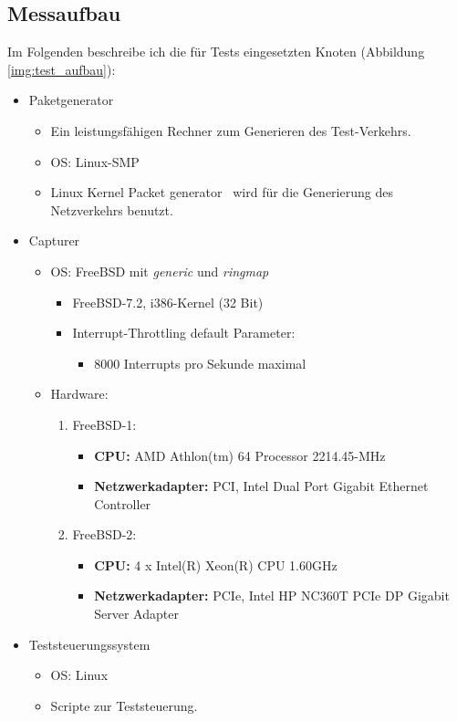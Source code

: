 \subsection{Messaufbau}\label{sec:messaufbau}
Im Folgenden beschreibe ich die für Tests eingesetzten Knoten (Abbildung
\ref{img:test_aufbau}): 
\begin{itemize}
	\item Paketgenerator
		\begin{itemize}
			\item Ein leistungsfähigen Rechner zum Generieren des Test-Verkehrs.
			\item OS: Linux-SMP
			\item Linux Kernel Packet generator~\cite{linux_pktgen} wird für
				die Generierung des Netzverkehrs benutzt.
		\end{itemize}
	\item Capturer
		\begin{itemize}
			\item OS: FreeBSD mit \emph{generic} und \emph{ringmap}
				\begin{itemize}
					\item FreeBSD-7.2, i386-Kernel (32 Bit)
					\item Interrupt-Throttling default Parameter:
						\begin{itemize}
							\item 8000 Interrupts pro Sekunde maximal
						\end{itemize}
				\end{itemize}
			\item Hardware:
				\begin{enumerate}
					\item FreeBSD-1:
						\begin{itemize}
							\item \textbf{CPU:} AMD Athlon(tm) 64 Processor 2214.45-MHz
							\item \textbf{Netzwerkadapter:} PCI, Intel Dual Port Gigabit Ethernet Controller
						\end{itemize}
					\item FreeBSD-2:
						\begin{itemize}
							\item \textbf{CPU:} 4 x Intel(R) Xeon(R) CPU 1.60GHz
							\item \textbf{Netzwerkadapter:} PCIe, Intel HP NC360T PCIe DP Gigabit Server Adapter	 
						\end{itemize}
				\end{enumerate}
						\end{itemize}
	\item Teststeuerungssystem
		\begin{itemize}
			\item OS: Linux
			\item Scripte zur Teststeuerung.
		\end{itemize}
\end{itemize}
